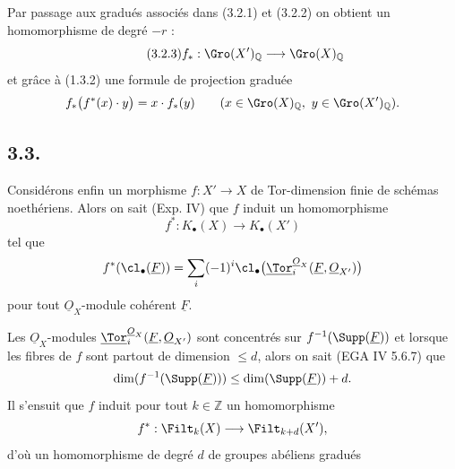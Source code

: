 
Par
passage aux gradués associés dans (3.2.1) et (3.2.2) on obtient un homomorphisme de degré \(-r\) :
\begin{equation}\tag{3.2.3}
 f_*:\Gro(X')_{\mathbb Q}\longrightarrow\Gro(X)_{\mathbb Q}
\end{equation}
et grâce à (1.3.2) une formule de projection graduée
\[
 f_*\bigl(f^*(x)\cdot y\bigr)=x\cdot f_*(y)
 \qquad (x\in\Gro(X)_{\mathbb Q},\ y\in\Gro(X')_{\mathbb Q}).
\]

\subsection*{3.3.}
Considérons enfin un morphisme \(f:X'\to X\) de Tor-dimension finie de schémas noethériens. Alors on sait (Exp. IV) que \(f\) induit un homomorphisme
\[
 f^*:K_\bullet(X)\longrightarrow K_\bullet(X')
\]
tel que
\[
 f^*(\cl_\bullet(\underline{F}))=
 \sum_i(-1)^i\cl_\bullet\bigl(\underline{\Tor}_i^{\underline{O}_X}(\underline{F},\underline{O}_{X'})\bigr)
\]
pour tout \(\underline{O}_X\)-module cohérent \(\underline{F}\).

Les \(\underline{O}_X\)-modules \(\underline{\Tor}_i^{\underline{O}_X}(\underline{F},\underline{O}_{X'})\) sont concentrés sur \(f^{-1}(\Supp(\underline{F}))\) et lorsque les fibres de \(f\) sont partout de dimension \(\leq d\), alors on sait (EGA IV 5.6.7) que
\[
 \dim(f^{-1}(\Supp(\underline{F})))\leq \dim(\Supp(\underline{F}))+d.
\]
Il s'ensuit que \(f\) induit pour tout \(k\in\mathbb Z\) un homomorphisme
\[
 f^*:\Filt_k(X)\longrightarrow\Filt_{k+d}(X'),
\]
d'où un homomorphisme de degré \(d\) de groupes abéliens gradués
